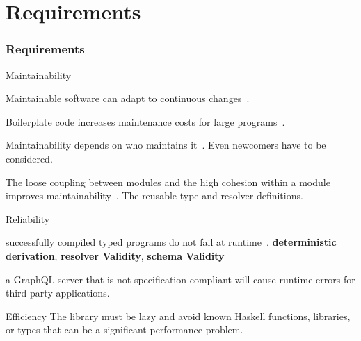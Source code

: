 \section{Requirements}

\begin{frame}[allowframebreaks]\frametitle{Requirements}  

\begin{block}{Maintainability}

Maintainable software can adapt to continuous changes~\cite{requirements-change-1,view-of-web, sof-sus-institute-maintainability}.


\begin{itemize}

     Boilerplate code increases maintenance costs for large programs~\cite{scrap-your-boilerplate}.

     Maintainability depends on who maintains it~\cite{contr-reduce-maintainability}. Even newcomers have to be considered.

    The loose coupling between modules and the high cohesion within a module improves maintainability~\cite{arc-modularity}. The reusable type and resolver definitions. 
    
\end{itemize}
\end{block}

\begin{block}{Reliability}

\begin{itemize}
     successfully compiled typed programs do not fail at runtime~\cite{milner-well-typed,wadler-well-typed}.  \textbf{deterministic derivation}, \textbf{resolver Validity}, \textbf{schema Validity}
    
     a GraphQL server that is not specification compliant will cause runtime errors for third-party applications.
\end{itemize}

\end{block}

\begin{block}{Efficiency}
The library must be lazy and avoid known Haskell functions, libraries, or types that can be a significant performance problem.
\end{block}

\end{frame}